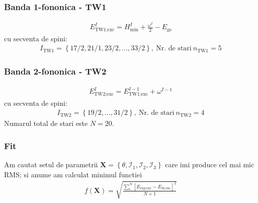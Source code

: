 \documentclass[12pt]{article}
\begin{document}
\subsubsection{Banda 1-fononica -  TW1}
\begin{align}
    E_\text{TW1;exc}^{I}=H_\text{min}^{I}+\frac{\omega^{I}}{2}-E_\text{gs}
\end{align}
cu secventa de spini:
\begin{align}
    I_\text{TW1}=\left\{17/2,21/1,23/2,\dots,33/2\right\},\ \text{Nr. de stari}\ n_\text{TW1}=5
\end{align}
\subsubsection{Banda 2-fononica -  TW2}
\begin{align}
    E_\text{TW2;exc}^{I}=E_\text{TW1;exc}^{I-1}+\omega^{I-1}
\end{align}
cu secventa de spini:
\begin{align}
    I_\text{TW2}=\left\{19/2,\dots,31/2\right\},\ \text{Nr. de stari}\ n_\text{TW2}=4
\end{align}
Numarul total de stari este $N=20$.
\subsubsection{Fit}
Am cautat setul de parametrii $\mathbf{X}=\left\{\theta,\mathcal{I}_1,\mathcal{I}_2,\mathcal{I}_3\right\}$ care imi produce cel mai mic RMS; si anume am calculat minimul functiei 
\begin{align}
    f(\mathbf{X})=\sqrt{\frac{\sum_i^N\left[E_\text{exp;exc}-E_\text{th;exc}\right]^2}{N+1}}
\end{align}
\end{document}
